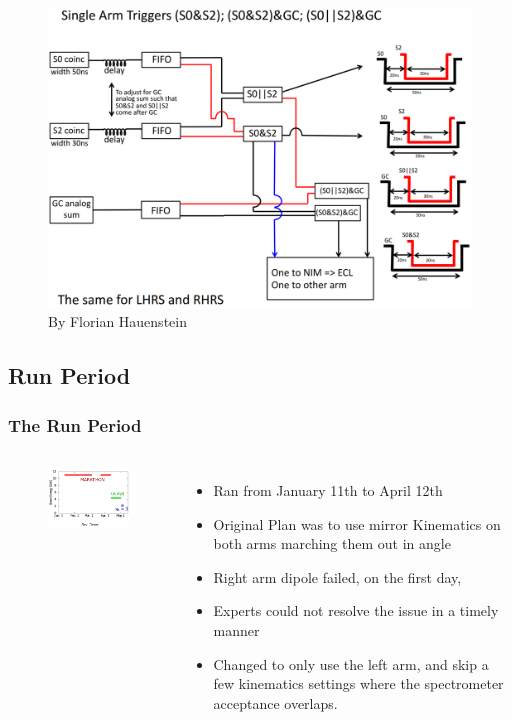 \documentclass{beamer}
\begin{document}
\begin{frame}
\vspace{-8pt}
\begin{figure}
	\includegraphics[width=12cm]{../images/trigger_1}
	\caption{By Florian Hauenstein}
\end{figure}
\end{frame}




\subsection{Run Period}

\begin{frame}
\frametitle{The Run Period}

	\begin{columns}
		\begin{figure}
			\includegraphics[width=5cm]{../images/run_per}
		\end{figure}
		\begin{itemize}
			\item Ran from January 11th to April 12th 
			\item Original Plan was to use mirror Kinematics on both arms marching them out in angle
			\item Right arm dipole failed, on the first day,
			\item Experts could not resolve the issue in a timely manner
			\item Changed to only use the left arm, and skip a few kinematics settings where the spectrometer acceptance overlaps.
		\end{itemize}
	\end{columns}
\end{frame}
\end{document}
